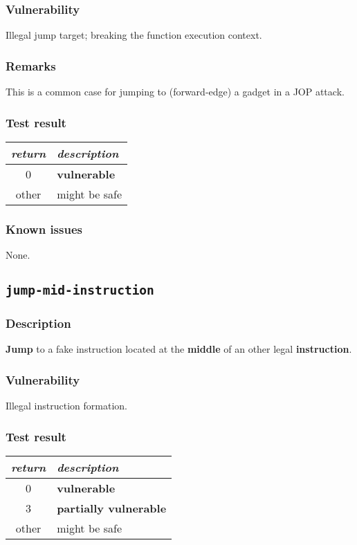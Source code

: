 \documentclass[a4paper]{book}
\begin{document}
\subsubsection{Vulnerability}
Illegal jump target; breaking the function execution context.

\subsubsection{Remarks}
This is a common case for jumping to (forward-edge) a gadget in a JOP attack.

\subsubsection{Test result}
\begin{tabular}{cl}
  \toprule
  \emph{return}  & \emph{description} \\
  \midrule
  0              & \textbf{vulnerable} \\
  other          & might be safe \\
  \bottomrule
\end{tabular}
  
\subsubsection{Known issues}

None.

\newpage
\subsection{\texttt{jump-mid-instruction}}\label{test-jump-mid-instruction}

\subsubsection{Description}
\textbf{Jump} to a fake instruction located at the \textbf{middle} of an other legal \textbf{instruction}.

\subsubsection{Vulnerability}
Illegal instruction formation.

\subsubsection{Test result}
\begin{tabular}{cl}
  \toprule
  \emph{return}  & \emph{description} \\
  \midrule
  0              & \textbf{vulnerable} \\
  3              & \textbf{partially vulnerable} \\
  other          & might be safe \\
  \bottomrule
\end{tabular}
  
\end{document}
